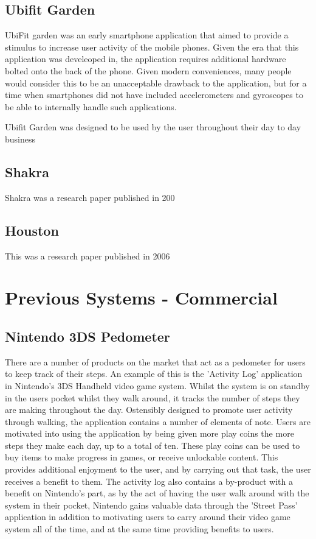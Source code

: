 \documentclass{l4proj}
\begin{document}
\subsection{Ubifit Garden}

UbiFit garden was an early smartphone application that aimed to provide a stimulus to increase user activity of the mobile phones. Given the era that this application was develeoped in, the application requires additional hardware bolted onto the back of the phone. Given modern conveniences, many people would consider this to be an unacceptable drawback to the application, but for a time when smartphones did not have included accelerometers and gyroscopes to be able to internally handle such applications.

Ubifit Garden was designed to be used by the user throughout their day to day business 

\subsection{Shakra}

Shakra was a research paper published in 200

\subsection{Houston}

This was a research paper published in 2006 

\section{Previous Systems - Commercial}

\subsection{Nintendo 3DS Pedometer}

There are a number of products on the market that act as a pedometer for users to keep track of their steps. An example of this is the 'Activity Log' application in Nintendo's 3DS Handheld video game system. Whilst the system is on standby in the users pocket whilst they walk around, it tracks the number of steps they are making throughout the day. Ostensibly designed to promote user activity through walking, the application contains a number of elements of note. Users are motivated into using the application by being given more play coins the more steps they make each day, up to a total of ten. These play coins can be used to buy items to make progress in games, or receive unlockable content. This provides additional enjoyment to the user, and by carrying out that task, the user receives a benefit to them. The activity log also contains a by-product with a benefit on Nintendo's part, as by the act of having the user walk around with the system in their pocket, Nintendo gains valuable data through the 'Street Pass' application in addition to motivating users to carry around their video game system all of the time, and at the same time providing benefits to users.
\end{document}
